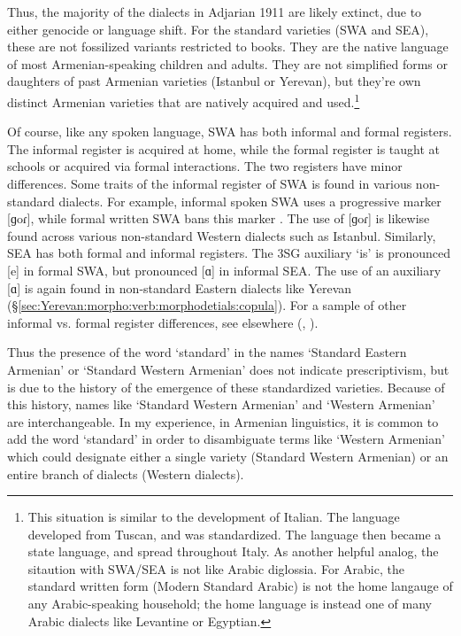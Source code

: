 Thus, the majority of the dialects in Adjarian 1911 are likely extinct, due to either genocide or language shift. For the standard varieties (SWA and SEA), these are not fossilized variants restricted to books. They are the native language of most Armenian-speaking children and adults. They are not simplified forms or daughters of past Armenian varieties (Istanbul or Yerevan), but they're own distinct Armenian varieties that are natively acquired and used.\footnote{This situation is similar to the development of Italian. The language developed from Tuscan, and was standardized. The language then became a state language, and spread throughout Italy. As another helpful analog, the sitaution with SWA/SEA is not like Arabic diglossia. For Arabic, the standard written form (Modern Standard Arabic) is not the home langauge of any Arabic-speaking household; the home language is instead one of many Arabic dialects like Levantine or Egyptian. }





Of course, like any spoken language, SWA has both informal and formal registers. The informal register is acquired at home, while the formal register is taught at schools or acquired via formal interactions. The two registers have minor differences. Some traits of the informal register of SWA is found in various non-standard dialects. For example, informal spoken SWA uses a progressive marker [ɡoɾ], while formal written SWA bans this marker \citep{donabedian-2001-tabouLinguisticArmenianOccidentalGorProgressive}. The use of [ɡoɾ] is likewise found across various non-standard Western dialects such as Istanbul. Similarly, SEA has both formal and informal registers. The 3SG auxiliary `is' is pronounced [e] in formal SWA, but pronounced [ɑ] in informal SEA. The use of an auxiliary [ɑ] is again found in non-standard Eastern dialects like Yerevan (\S\ref{sec:Yerevan:morpho:verb:morphodetials:copula}). For a sample of other informal vs. formal register differences, see elsewhere (\citealt{Gharagyulyan-1981-ColloquialArmenian,Zakaryan-1981-ColloquialArmenian,Aghayan-1981-ColloquialArmenian,Kavassian-1983-CertainProblemMorphologyArmenianMontreal,DumTragut-2009-ArmenianReferenceGrammar}, \citealt[ch3]{Karapetian-2014-TeachArmenianEasternArmenianHeritage}).


Thus the presence of the word `standard' in the names `Standard Eastern Armenian' or `Standard Western Armenian' does not indicate prescriptivism, but is due to the history of the emergence of these standardized varieties. Because of this history, names like `Standard Western Armenian' and `Western Armenian' are interchangeable. In my experience, in Armenian linguistics, it is common to add the word `standard' in order to disambiguate terms like `Western Armenian' which could designate either a single variety (Standard Western Armenian) or an entire branch of dialects (Western dialects). 

